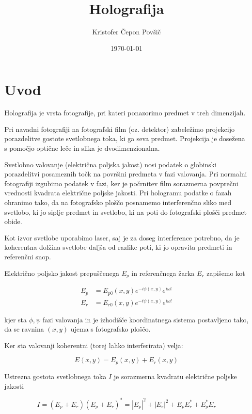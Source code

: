 \documentclass[11pt]{article}
\author{Kristofer Čepon Povšič}
\date{\today}
\title{Holografija}
\begin{document}
\maketitle
\tableofcontents

\section{Uvod}
\label{sec:org072c4ed}

Holografija je vrsta fotografije, pri kateri ponazorimo predmet v treh dimenzijah.

Pri navadni fotografiji na fotografski film (oz. detektor) zabeležimo projekcijo porazdelitve gostote svetlobnega toka, ki ga seva predmet. Projekcija je dosežena s pomočjo optične leče in slika je dvodimenzionalna.

Svetlobno valovanje (električna poljska jakost) nosi podatek o globinski porazdelitvi posameznih točk na površini predmeta v fazi valovanja. Pri normalni fotografiji izgubimo podatek v fazi, ker je počrnitev film sorazmerna povprečni vrednosti kvadrata električne poljske jakosti. Pri hologramu podatke o fazah ohranimo tako, da na fotografsko ploščo posnamemo interferenčno sliko med svetlobo, ki jo siplje predmet in svetlobo, ki na poti do fotografski plošči predmet obide.

Kot izvor svetlobe uporabimo laser, saj je za doseg interference potrebno, da je koherentna dolžina svetlobe daljša od razlike poti, ki jo opravita predmeti in referenčni snop.

Električno poljsko jakost prepuščenega \(E_p\) in referenčnega žarka  \(E_r\) zapišemo kot

\begin{align*}
  E_p &= E_{p0}(x, y) e ^{- i \phi (x, y) } e ^{i \omega t} \\
  E_r &= E_{r0} (x, y) e ^{- i \psi (x, y)} e ^{i \omega t}
\end{align*}

kjer sta \(\phi, \psi\) fazi valovanja in je izhodišče koordinatnega sistema postavljeno tako, da se ravnina \((x, y)\) ujema s fotografsko ploščo.

Ker sta valovanji koherentni (torej lahko interferirata) velja:

\[ E(x, y) = E_p (x, y) + E_r (x, y)
\]

Ustrezna gostota svetlobnega toka \(I\) je sorazmerna kvadratu električne poljske jakosti

\begin{equation}
\label{eq:1}
I = (E_p + E_r) (E_p + E_r)^{*} = \left| E_p \right| ^2 + \left| E_r \right| ^2 + E_p E^{*}_r + E_p^{*}E_r
\end{equation}
\end{document}
